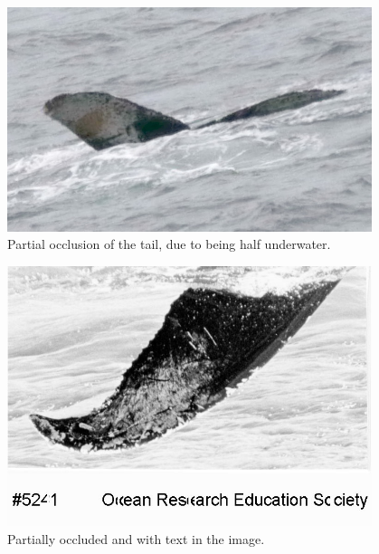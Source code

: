 \documentclass[12pt,
    brazil,			%
	english,        %
	]{article}
\begin{document}
\begin{figure}
    \centering
    \includegraphics[width=0.95\textwidth]{images/whales/0d757866b.jpg}
    \caption{Partial occlusion of the tail, due to being half underwater.}
    \label{fig:whale:0d757866b}
\end{figure}


\begin{figure}
    \centering
    \includegraphics[width=0.95\textwidth]{images/whales/0db59bbec.jpg}
    \caption{Partially occluded and with text in the image.}
    \label{fig:whale:0db59bbec}
\end{figure}
\end{document}

